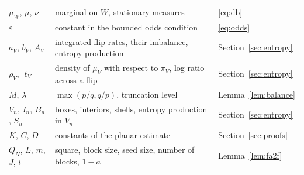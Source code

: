 \documentclass[11pt]{amsart}
\theoremstyle{remark}
\begin{document}
\begin{center}
\begin{tabular}{p{3.3cm}p{7.6cm}p{3.2cm}}
$\mu_W$, $\mu$, $\nu$ & marginal on $W$, stationary measures & \eqref{eq:db}\\
$\varepsilon$ & constant in the bounded odds condition & \eqref{eq:odds}\\
$a_V$, $b_V$, $A_V$ & integrated flip rates, their imbalance, entropy production & Section~\ref{sec:entropy}\\
$\rho_V$, $\ell_V$ & density of $\mu_V$ with respect to $\pi_V$, log ratio across a flip & Section~\ref{sec:entropy}\\
$M$, $\lambda$ & $\max(p/q,q/p)$, truncation level & Lemma~\ref{lem:balance}\\
$V_n$, $I_n$, $B_n$, $S_n$ & boxes, interiors, shells, entropy production in $V_n$ & Section~\ref{sec:entropy}\\
$K$, $C$, $D$ & constants of the planar estimate & Section~\ref{sec:proofs}\\
$Q_N$, $L$, $m$, $J$, $t$ & square, block size, seed size, number of blocks, $1-a$ & Lemma~\ref{lem:fa2f}\\
\bottomrule
\end{tabular}
\end{center}
\end{document}
